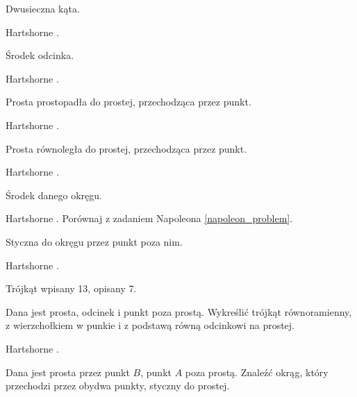 \begin{problem}
    Dwusieczna kąta.
\end{problem}

Hartshorne \cite[s. 23]{hartshorne2000}. %

\begin{problem}
    Środek odcinka.
\end{problem}

Hartshorne \cite[s. 23]{hartshorne2000}. %

\begin{problem}
    Prosta prostopadła do prostej, przechodząca przez punkt.
\end{problem} %

Hartshorne \cite[s. 23, 24]{hartshorne2000}.

\begin{problem}
    Prosta równoległa do prostej, przechodząca przez punkt.
\end{problem} %

Hartshorne \cite[s. 24]{hartshorne2000}.

\begin{problem}
    Środek danego okręgu.
\end{problem} %

Hartshorne \cite[s. 24]{hartshorne2000}.
Porównaj z zadaniem Napoleona \ref{napoleon_problem}.

\begin{problem}
    Styczna do okręgu przez punkt poza nim.
\end{problem} %

Hartshorne \cite[s. 24]{hartshorne2000}.

Trójkąt wpisany 13, opisany 7. %

\begin{problem}
    Dana jest prosta, odcinek i punkt poza prostą.
    Wykreślić trójkąt równoramienny, z wierzchołkiem w punkie i z podstawą równą odcinkowi na prostej.
\end{problem} %

Hartshorne \cite[s. 25]{hartshorne2000}.

\begin{problem}
    Dana jest prosta przez punkt $B$, punkt $A$ poza prostą.
    Znaleźć okrąg, który przechodzi przez obydwa punkty, styczny do prostej.
\end{problem} %

